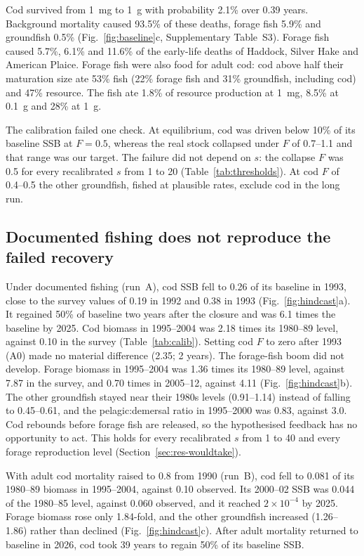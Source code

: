 \documentclass[12pt,letterpaper,fleqn]{article}
\begin{document}
Cod survived from 1~mg to 1~g with probability 2.1\% over 0.39 years. Background mortality caused 93.5\% of these deaths, forage fish 5.9\% and groundfish 0.5\% (Fig.~\ref{fig:baseline}c, Supplementary Table~S3). Forage fish caused 5.7\%, 6.1\% and 11.6\% of the early-life deaths of Haddock, Silver Hake and American Plaice. Forage fish were also food for adult cod: cod above half their maturation size ate 53\% fish (22\% forage fish and 31\% groundfish, including cod) and 47\% resource. The fish ate 1.8\% of resource production at 1~mg, 8.5\% at 0.1~g and 28\% at 1~g.

The calibration failed one check. At equilibrium, cod was driven below 10\% of its baseline SSB at $F=0.5$, whereas the real stock collapsed under $F$ of 0.7--1.1 and that range was our target. The failure did not depend on $s$: the collapse $F$ was 0.5 for every recalibrated $s$ from 1 to 20 (Table~\ref{tab:thresholds}). At cod $F$ of 0.4--0.5 the other groundfish, fished at plausible rates, exclude cod in the long run.

\subsection{Documented fishing does not reproduce the failed recovery}\label{sec:res-hindcast}

Under documented fishing (run~A), cod SSB fell to 0.26 of its baseline in 1993, close to the survey values of 0.19 in 1992 and 0.38 in 1993 (Fig.~\ref{fig:hindcast}a). It regained 50\% of baseline two years after the closure and was 6.1 times the baseline by 2025. Cod biomass in 1995--2004 was 2.18 times its 1980--89 level, against 0.10 in the survey (Table~\ref{tab:calib}). Setting cod $F$ to zero after 1993 (A0) made no material difference (2.35; 2 years). The forage-fish boom did not develop. Forage biomass in 1995--2004 was 1.36 times its 1980--89 level, against 7.87 in the survey, and 0.70 times in 2005--12, against 4.11 (Fig.~\ref{fig:hindcast}b). The other groundfish stayed near their 1980s levels (0.91--1.14) instead of falling to 0.45--0.61, and the pelagic:demersal ratio in 1995--2000 was 0.83, against 3.0. Cod rebounds before forage fish are released, so the hypothesised feedback has no opportunity to act. This holds for every recalibrated $s$ from 1 to 40 and every forage reproduction level (Section~\ref{sec:res-wouldtake}).

With adult cod mortality raised to 0.8 from 1990 (run~B), cod fell to 0.081 of its 1980--89 biomass in 1995--2004, against 0.10 observed. Its 2000--02 SSB was 0.044 of the 1980--85 level, against 0.060 observed, and it reached $2\times10^{-4}$ by 2025. Forage biomass rose only 1.84-fold, and the other groundfish increased (1.26--1.86) rather than declined (Fig.~\ref{fig:hindcast}c). After adult mortality returned to baseline in 2026, cod took 39 years to regain 50\% of its baseline SSB.
\end{document}
